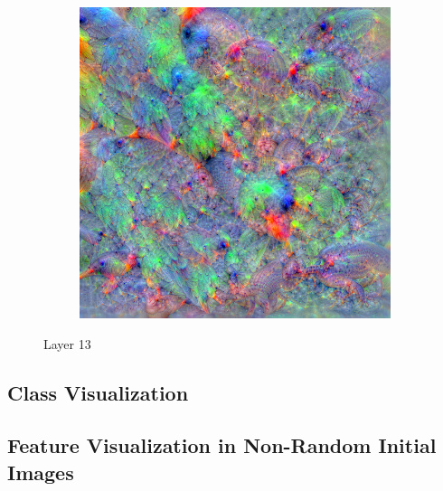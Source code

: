 \begin{figure}
    \hfill
    \begin{subfigure}[t]{0.31\textwidth}
        \captionsetup{justification=centering}
        \centering
        \includegraphics[width=.7\linewidth]{figuras/feat_vis/experiments/final/l13/random_image_pl6_lr1e-1_layer28_blur-0.4.png}
        \caption{}
    \end{subfigure}

    \caption{Layer 13}

\end{figure}
\subsection{Class Visualization}

\subsection{Feature Visualization in Non-Random Initial Images}

